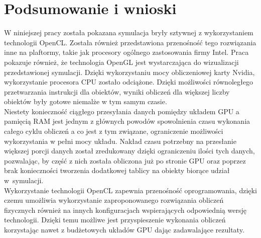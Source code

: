 \chapter{Podsumowanie i wnioski}

W niniejszej pracy została pokazana symulacja bryły sztywnej z wykorzystaniem technologii OpenCL. Została również przedstawiona przenośność tego rozwiązania inne na plaftormy, takie jak procesory ogólnego zastosowania firmy Intel. Praca pokazuje również, że technologia OpenGL jest wystarczająca do wizualizacji przedstawionej symulacji. 
Dzięki wykorzystaniu mocy obliczeniowej karty Nvidia, wykorzystanie procesora CPU zostało odciążone. Dzięki możliwości równoległego przetwarzania instrukcji dla obiektów, wyniki obliczeń dla większej liczby obiektów były gotowe niemalże w tym samym czasie.\\
Niestety konieczność ciągłego przesyłania danych pomiędzy układem GPU a pamięcią RAM jest jednym z głównych powodów spowolnienia czasu wykonania całego cyklu obliczeń a co jest z tym związane, ograniczenie możliwości wykorzystania w pełni mocy układu. Nakład czasu potrzebny na przesłanie większej porcji danych został zredukowany dzięki ograniczeniu ilości tych danych, pozwalając, by część z nich została obliczona już po stronie GPU oraz poprzez brak konieczności tworzenia dodatkowej tablicy na obiekty biorące udział w~symulacji. \\
Wykorzystanie technologii OpenCL zapewnia przenośność oprogramowania, dzięki czemu umożliwia wykorzystanie zaproponowanego rozwiązania obliczeń fizycznych również na innych konfiguracjach wspierających odpowiednią wersję technologii. Dzięki temu możliwe jest przyspieszenie wykonania obliczeń korzystając nawet z budżetowych układów GPU dając zadawalające rezultaty.\\
